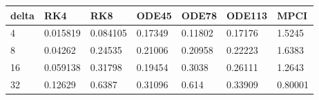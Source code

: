 \begin{tabular}{lllllll}
delta & RK4 & RK8 & ODE45 & ODE78 & ODE113 & MPCI \\ 
\hline 
4 & 0.015819 & 0.084105 & 0.17349 & 0.11802 & 0.17176 & 1.5245 \\ 
8 & 0.04262 & 0.24535 & 0.21006 & 0.20958 & 0.22223 & 1.6383 \\ 
16 & 0.059138 & 0.31798 & 0.19454 & 0.3038 & 0.26111 & 1.2643 \\ 
32 & 0.12629 & 0.6387 & 0.31096 & 0.614 & 0.33909 & 0.80001 \\ 
\hline 
\end{tabular}
